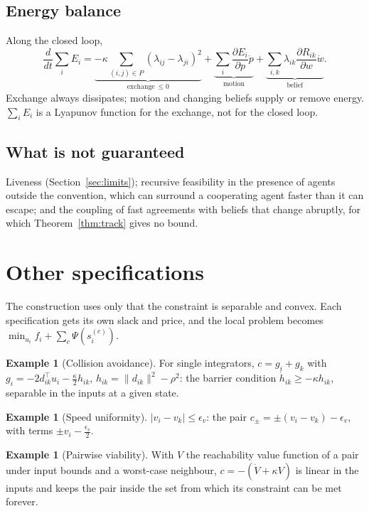 \documentclass[11pt]{article}
\theoremstyle{definition}
\newtheorem{example}[theorem]{Example}
\theoremstyle{remark}
\begin{document}
\subsection{Energy balance}
Along the closed loop,
\[
\frac{d}{dt}\sum_iE_i=\underbrace{-\kappa\sum_{(i,j)\in P}(\lambda_{ij}-\lambda_{ji})^2}_{\text{exchange}\ \le0}+\underbrace{\sum_i\frac{\partial E_i}{\partial p}\dot p}_{\text{motion}}+\underbrace{\sum_{i,k}\lambda_{ik}\frac{\partial R_{ik}}{\partial w}\dot w}_{\text{belief}} .
\]
Exchange always dissipates; motion and changing beliefs supply or remove energy. $\sum_iE_i$ is a Lyapunov function for the exchange, not for the closed loop.

\subsection{What is not guaranteed}
Liveness (Section~\ref{sec:limits}); recursive feasibility in the presence of agents outside the convention, which can surround a cooperating agent faster than it can escape; and the coupling of fast agreements with beliefs that change abruptly, for which Theorem~\ref{thm:track} gives no bound.

\section{Other specifications}\label{sec:specs}
The construction uses only that the constraint is separable and convex. Each specification gets its own slack and price, and the local problem becomes $\min_{u_i}f_i+\sum_c\Psi(s_i^{(c)})$.

\begin{example}[Collision avoidance]\label{ex:ca}
For single integrators, $c=g_i+g_k$ with $g_i=-2d_{ik}^\top u_i-\frac\kappa2h_{ik}$, $h_{ik}=\|d_{ik}\|^2-\rho^2$: the barrier condition $\dot h_{ik}\ge-\kappa h_{ik}$, separable in the inputs at a given state.
\end{example}

\begin{example}[Speed uniformity]
$|v_i-v_k|\le\epsilon_v$: the pair $c_\pm=\pm(v_i-v_k)-\epsilon_v$, with terms $\pm v_i-\frac{\epsilon_v}2$.
\end{example}

\begin{example}[Pairwise viability]
With $V$ the reachability value function of a pair under input bounds and a worst-case neighbour, $c=-(\dot V+\kappa V)$ is linear in the inputs and keeps the pair inside the set from which its constraint can be met forever.
\end{example}
\end{document}
